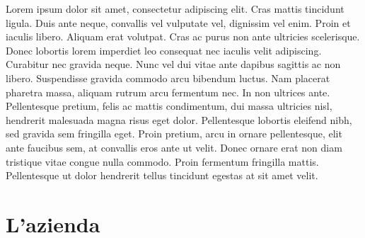 \documentclass[a4paper, 12pt, twoside, openright]{book}
\renewcommand{\chaptermark}[1]{\markboth{\thechapter. {\slshape{##1}}}{}}
\newenvironment{abstract}{\cleardoublepage \null \vfill \begin{center}\bfseries\abstractname \end{center}}{\vfill\null}
\begin{document}
\begin{abstract} %
\markboth{}{} %
\thispagestyle{empty}
Lorem ipsum dolor sit amet, consectetur adipiscing elit. Cras mattis tincidunt ligula. Duis ante neque, convallis vel vulputate vel, dignissim vel enim. Proin et iaculis libero. Aliquam erat volutpat. Cras ac purus non ante ultricies scelerisque. Donec lobortis lorem imperdiet leo consequat nec iaculis velit adipiscing. Curabitur nec gravida neque. Nunc vel dui vitae ante dapibus sagittis ac non libero. Suspendisse gravida commodo arcu bibendum luctus. Nam placerat pharetra massa, aliquam rutrum arcu fermentum nec. In non ultrices ante. Pellentesque pretium, felis ac mattis condimentum, dui massa ultricies nisl, hendrerit malesuada magna risus eget dolor. Pellentesque lobortis eleifend nibh, sed gravida sem fringilla eget. Proin pretium, arcu in ornare pellentesque, elit ante faucibus sem, at convallis eros ante ut velit. Donec ornare erat non diam tristique vitae congue nulla commodo. Proin fermentum fringilla mattis. Pellentesque ut dolor hendrerit tellus tincidunt egestas at sit amet velit.
\end{abstract}


\mainmatter

\cfoot{}

\chapter{L'azienda} %
\end{document}
